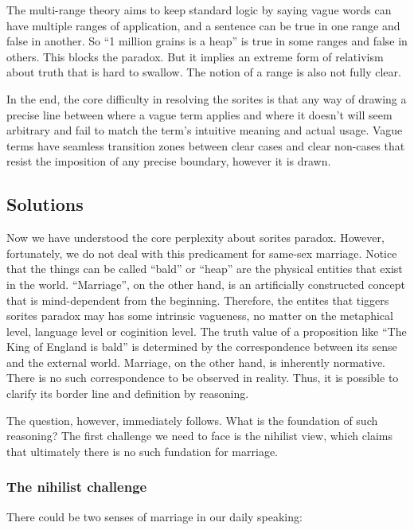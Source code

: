\documentclass[man,floatsintext]{apa7}
\begin{document}
The multi-range theory aims to keep standard logic by saying vague words can have multiple ranges of application, and a sentence can be true in one range and false in another. So ``1 million grains is a heap'' is true in some ranges and false in others. This blocks the paradox. But it implies an extreme form of relativism about truth that is hard to swallow. The notion of a range is also not fully clear.

In the end, the core difficulty in resolving the sorites is that any way of drawing a precise line between where a vague term applies and where it doesn't will seem arbitrary and fail to match the term's intuitive meaning and actual usage. Vague terms have seamless transition zones between clear cases and clear non-cases that resist the imposition of any precise boundary, however it is drawn.

\subsection{Solutions}

Now we have understood the core perplexity about sorites paradox. However, fortunately, we do not deal with this predicament for same-sex marriage. Notice that the things can be called ``bald'' or ``heap'' are the physical entities that exist in the world. ``Marriage'', on the other hand, is an artificially constructed concept that is mind-dependent from the beginning. Therefore, the entites that tiggers sorites paradox may has some intrinsic vagueness, no matter on the metaphical level, language level or coginition level. The truth value of a proposition like ``The King of England is bald'' is determined by the correspondence between its sense and the external world. Marriage, on the other hand, is inherently normative. There is no such correspondence to be observed in reality. Thus, it is possible to clarify its border line and definition by reasoning.

The question, however, immediately follows. What is the foundation of such reasoning? The first challenge we need to face is the nihilist view, which claims that ultimately there is no such fundation for marriage.

\subsubsection{The nihilist challenge}
\label{nihi}

There could be two senses of marriage in our daily speaking: 
\end{document}
